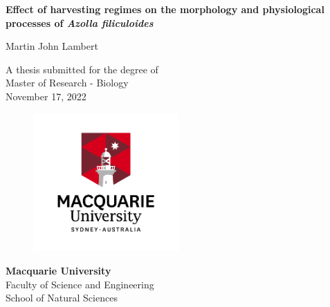 \begin{center}

\vspace*{4em}
\Huge
\textbf{Effect of harvesting regimes on the morphology and physiological processes of \textit{Azolla filiculoides}}

\vspace{2em}
\LARGE
Martin John Lambert
\vspace{2em}

\normalsize
A thesis submitted for the degree of\\
\Large
\vspace{1em}
Master of Research - Biology\\
\vspace{1em}
\normalsize
November 17, 2022\\
\vspace{3em}
\begin{figure}[h!]
  \centering
  \includegraphics[width = 15em]{../img/mq_logo.png}
\end{figure}
\large
\textbf{Macquarie University}\\
\normalsize
Faculty of Science and Engineering\\
School of Natural Sciences

\end{center}

\thispagestyle{empty}
